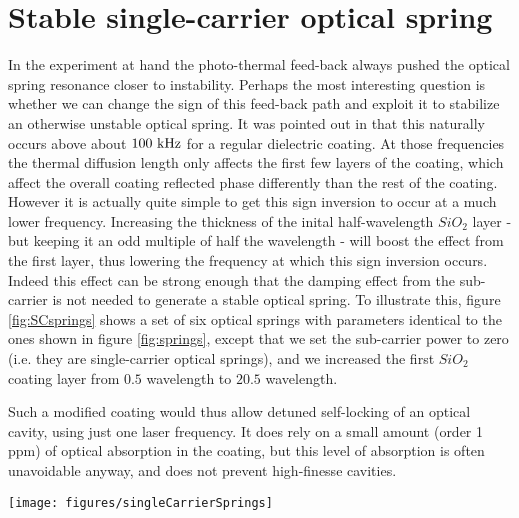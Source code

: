 \section{Stable single-carrier optical spring}
\label{sec:SCs}
In the experiment at hand the photo-thermal feed-back always pushed the optical spring resonance closer to instability.
Perhaps the most interesting question is whether we can change the sign of this feed-back path and exploit it to stabilize an otherwise unstable optical spring. It was pointed out in \cite{PhysRevD.91.023010} that this naturally occurs above about $100~{\rm kHz}$ for a regular dielectric coating. 
At those frequencies the thermal diffusion length only affects the first few layers of the coating, which affect the overall coating reflected phase differently than the rest of the coating.
However it is actually quite simple to get this sign inversion to occur at a much lower frequency. Increasing the thickness of the inital half-wavelength $SiO_2$ layer - but keeping it an odd multiple of half the wavelength - will boost the effect from the first layer, thus lowering the frequency at which this sign inversion occurs. Indeed this effect can be strong enough that the damping effect from the sub-carrier is not needed to generate a stable optical spring. To illustrate this, figure \ref{fig:SCsprings} shows a set of six optical springs with parameters identical to the ones shown in figure \ref{fig:springs}, except that we set the sub-carrier power to zero (i.e. they are single-carrier optical springs), and we increased the first $SiO_2$ coating layer from $0.5$ wavelength to $20.5$ wavelength.

Such a modified coating would thus allow detuned self-locking  of an optical cavity, using just one laser frequency. It does rely on a small amount (order 1 ppm) of optical absorption in the coating, but this level of absorption is often unavoidable anyway, and does not prevent high-finesse cavities. 
\begin{figure*}[thb]
\centering
\texttt{[image: figures/singleCarrierSprings]}
\caption{Stable single-carrier optical springs (no sub-carrier) with modified coating - the first coating layer is $20.5$ wavelength thick. See text for details. The six traces otherwise have the same parameters as the best-fit optical springs in figure \ref{fig:springs}. }
\label{fig:SCsprings}
\end{figure*}








